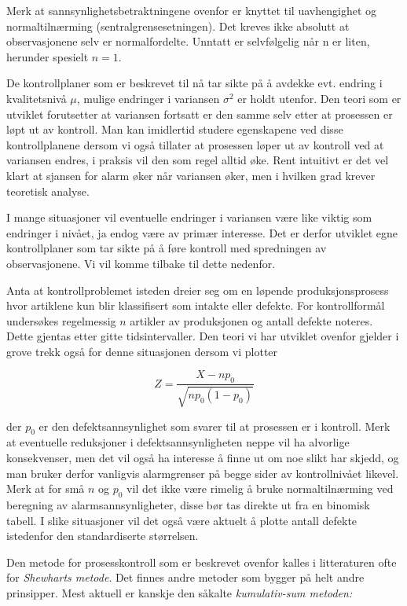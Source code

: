 Merk at sannsynlighetsbetraktningene ovenfor er knyttet til uavhengighet og
normaltilnærming (sentralgrensesetningen). Det kreves ikke absolutt at
observasjonene selv er normalfordelte. Unntatt er selvfølgelig når n er
liten, herunder spesielt $n=1$.


De kontrollplaner som er beskrevet til nå tar sikte på å
avdekke evt. endring i kvalitetsnivå $\mu$, mulige endringer
i variansen ${\sigma}^2$ er holdt utenfor.  Den teori som er utviklet
forutsetter at variansen fortsatt er den samme selv etter at prosessen
er løpt ut av kontroll.  Man kan imidlertid studere egenskapene ved 
disse kontrollplanene dersom vi også tillater at prosessen løper
ut av kontroll ved at variansen endres, i praksis vil den som regel
alltid øke.  Rent intuitivt er det vel klart at sjansen for alarm 
øker når variansen øker, men i hvilken grad krever teoretisk
analyse.

I mange situasjoner vil eventuelle endringer i variansen være like
viktig som endringer i nivået, ja endog være av primær
interesse.  Det er derfor utviklet egne kontrollplaner som tar sikte
på å føre kontroll med spredningen av observasjonene.  Vi
vil komme tilbake til dette nedenfor.

Anta at kontrollproblemet isteden dreier seg om en løpende 
produk\-sjons\-prosess hvor artiklene kun blir klassifisert som intakte 
eller defekte.  For kontrollformål undersøkes regelmessig $n$
artikler av produksjonen og antall defekte noteres.  Dette gjentas
etter gitte tidsintervaller.  Den teori vi har utviklet ovenfor gjelder 
i grove trekk også for denne situasjonen dersom vi plotter

\[   Z=\frac{X-np_0}{\sqrt{np_0(1-p_0)}}      \]

\noindent der $p_0$ er den defektsannsynlighet som svarer til at prosessen er 
i kontroll.  Merk at eventuelle reduksjoner i defektsannsynligheten
neppe vil ha alvorlige konsekvenser, men det vil også ha interesse
å finne ut om noe slikt har skjedd, og man bruker derfor vanligvis
alarmgrenser på begge sider av kontrollnivået likevel.  Merk
at for små $n$ og $p_0$ vil det ikke være rimelig å bruke
normaltilnærming ved beregning av alarmsannsynligheter, disse 
bør tas direkte ut fra en binomisk tabell.  I slike situasjoner vil
det også være aktuelt å plotte antall defekte istedenfor
den standardiserte størrelsen.

Den metode for prosesskontroll som er beskrevet ovenfor kalles i 
litteraturen ofte for {\em Shewharts metode}.  Det finnes andre metoder
som bygger på helt andre prinsipper.  Mest aktuell er kanskje den
såkalte {\em kumulativ-sum metoden:}

